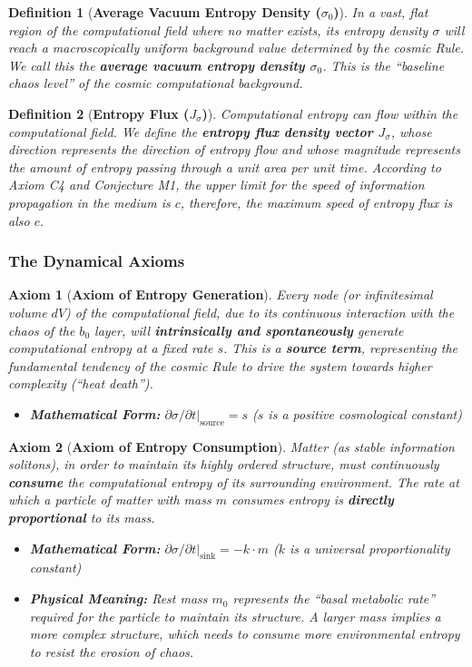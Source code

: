 \documentclass[11pt, a4paper]{article}
\newtheorem{axiom}{Axiom}[section]
\newtheorem{definition}{Definition}[section]
\begin{document}
\begin{definition}[\textbf{Average Vacuum Entropy Density ($\sigma_0$)}]
In a vast, flat region of the computational field where no matter exists, its entropy density $\sigma$ will reach a macroscopically uniform background value determined by the cosmic Rule. We call this the \textbf{average vacuum entropy density $\sigma_0$}. This is the ``baseline chaos level'' of the cosmic computational background.
\end{definition}

\begin{definition}[\textbf{Entropy Flux ($J_\sigma$)}]
Computational entropy can flow within the computational field. We define the \textbf{entropy flux density vector $J_\sigma$}, whose direction represents the direction of entropy flow and whose magnitude represents the amount of entropy passing through a unit area per unit time. According to Axiom C4 and Conjecture M1, the upper limit for the speed of information propagation in the medium is $c$, therefore, the maximum speed of entropy flux is also $c$.
\end{definition}

\subsubsection{The Dynamical Axioms}

\begin{axiom}[\textbf{Axiom of Entropy Generation}]
Every node (or infinitesimal volume $dV$) of the computational field, due to its continuous interaction with the chaos of the $b_0$ layer, will \textbf{intrinsically and spontaneously} generate computational entropy at a fixed rate $s$. This is a \textbf{source term}, representing the fundamental tendency of the cosmic Rule to drive the system towards higher complexity (``heat death'').
\begin{itemize}
    \item \textbf{Mathematical Form:} $\partial\sigma/\partial t |_{\text{source}} = s$ ($s$ is a positive cosmological constant)
\end{itemize}
\end{axiom}

\begin{axiom}[\textbf{Axiom of Entropy Consumption}]
Matter (as stable information solitons), in order to maintain its highly ordered structure, must continuously \textbf{consume} the computational entropy of its surrounding environment. The rate at which a particle of matter with mass $m$ consumes entropy is \textbf{directly proportional} to its mass.
\begin{itemize}
    \item \textbf{Mathematical Form:} $\partial\sigma/\partial t |_{\text{sink}} = -k \cdot m$ ($k$ is a universal proportionality constant)
    \item \textbf{Physical Meaning:} Rest mass $m_0$ represents the ``basal metabolic rate'' required for the particle to maintain its structure. A larger mass implies a more complex structure, which needs to consume more environmental entropy to resist the erosion of chaos.
\end{itemize}
\end{axiom}
\end{document}
